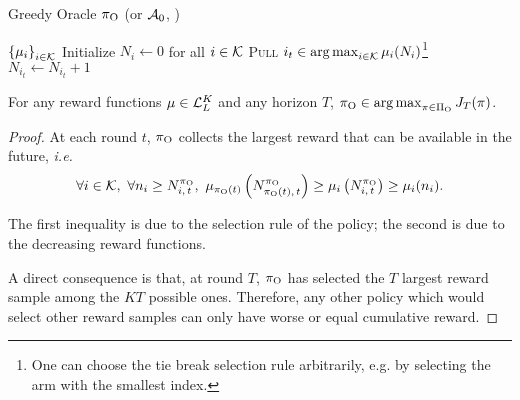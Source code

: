 \begin{minipage}{\textwidth}
\renewcommand*\footnoterule{}
\begin{savenotes}
\begin{algorithm}[H]
\caption{Greedy Oracle $\pi_{\rm O}$ (or $\mathcal{A}_{\rm 0}$, \citet{heidari2016tight})}
\label{alg:greedy-oracle}
\begin{algorithmic}[1]
	\Require $\left\{\mu_i\right\}_{i \in \mathcal{K}}$
	\State Initialize $N_i \leftarrow 0$ for all $i \in \mathcal{K}$
		\State \textsc{Pull}  $i_t \in \operatorname*{arg\,max}_{i \in \mathcal{K}} \mu_i(N_{i})$\footnote{One can choose the tie break selection rule arbitrarily, e.g. by selecting the arm with the smallest index.}
		\State $N_{i_t} \leftarrow N_{i_t} + 1$
	\EndFor
\end{algorithmic}
\end{algorithm}
\end{savenotes}
\end{minipage}
\begin{proposition}
For any reward functions $\mu \in \mathcal{L}_L^K$ and any horizon $T$, $\pi_{\rm O} \in \operatorname*{arg\,max}_{\pi \in \Pi_{\rm O}} J_T(\pi)$.
\end{proposition}%
\begin{proof}

At each round $t$, $\pi_{\rm O}$ collects the largest reward that can be available in the future, \textit{i.e.} 
\[
\forall i \in \mathcal{K}, \ \forall n_i \geq N_{i,\,t}^{\pi_{\rm O}}, \ \mu_{\pi_{\rm O}(t)}\left(N_{\pi_{\rm O}(t),\,t}^{\pi_{\rm O}}\right) \geq\mu_{i}\left(N_{i,\,t}^{\pi_{\rm O}}\right)  \geq \mu_i(n_i).
\]

The first inequality is due to the selection rule of the policy; the second is due to the decreasing reward functions. 

A direct consequence is that, at round $T$, $\pi_{\rm O}$ has selected the $T$ largest reward sample among the $KT$ possible ones. Therefore, any other policy which would select other reward samples can only have worse or equal cumulative reward. 
\end{proof}

